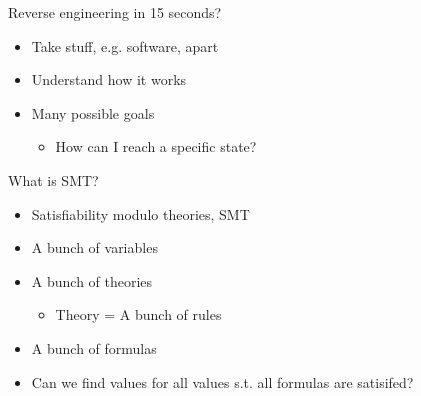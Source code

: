 \documentclass[10pt, compress, aspectratio=169]{beamer}
\begin{document}
\begin{frame}{Reverse engineering in 15 seconds?}

 \begin{itemize}
  \item Take stuff, e.g. software, apart
  \item Understand how it works
  \item Many possible goals
  \begin{itemize}
  	\item How can I reach a specific state?
  \end{itemize}  
  \end{itemize}    

\end{frame}


\begin{frame}{What is SMT?}

  \begin{itemize}
  \item Satisfiability modulo theories, SMT
  \item A bunch of variables
  \item A bunch of theories
  \begin{itemize}
    \item Theory = A bunch of rules
  \end{itemize}  
  \item A bunch of formulas
  \item Can we find values for all values s.t. all formulas are satisifed?
  \end{itemize}   

\end{frame}
\end{document}
